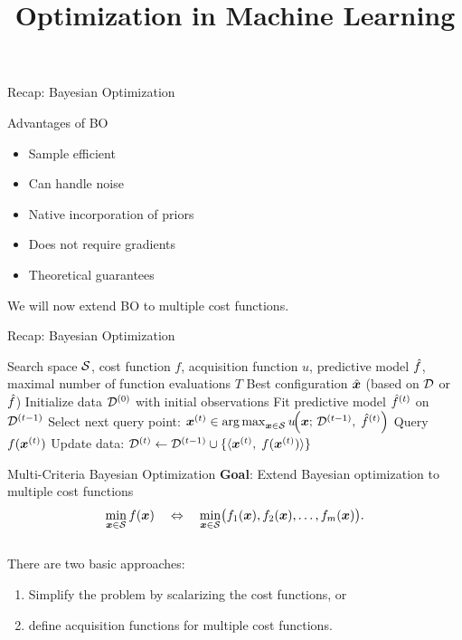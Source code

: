 \documentclass[11pt,compress,t,notes=noshow,xcolor=table]{beamer}
\title{Optimization in Machine Learning}
\begin{document}

\begin{framev}{Recap: Bayesian Optimization}
\begin{block}{Advantages of BO}
\begin{itemize}
\item Sample efficient
\item Can handle noise
\item Native incorporation of priors
\item Does not require gradients
\item Theoretical guarantees
\end{itemize}
\end{block}
We will now extend BO to multiple cost functions.
\end{framev}


\begin{framev}{Recap: Bayesian Optimization}
\begin{center}
\begin{algorithm}[H]
\caption{Bayesian optimization loop}
\begin{algorithmic}[1]
\Require Search space $\S$, cost function $f$, acquisition function $u$, predictive model $\fh$, maximal number of function evaluations $T$
\Ensure Best configuration $\hat{\xv}$ (based on $\D$ or $\fh$)
\State Initialize data $\D^{(0)}$ with initial observations
\State Fit predictive model $\fh^{(t)}$ on $\D^{(t-1)}$
\State Select next query point:
\State $\xv^{(t)} \in \argmax_{\xv \in \S} u\!\Bigl(\xv;\,\D^{(t-1)},\;\fh^{(t)}\Bigr)$
\State Query $f(\xv^{(t)})$
\State Update data:
\State $\D^{(t)} \leftarrow \D^{(t-1)} \cup \{\langle \xv^{(t)},\;f(\xv^{(t)}) \rangle \}$
\EndFor
\end{algorithmic}
\end{algorithm}
\end{center}
\end{framev}


\begin{framev}{Multi-Criteria Bayesian Optimization}
\textbf{Goal}: Extend Bayesian optimization to multiple cost functions
$$
\min_{\xv \in \S}  \fx
\quad \Leftrightarrow \quad
\min_{\xv \in \S} \bigl(\fkx[1], \fkx[2], \dots, \fkx[m]\bigr).
$$\\
\spacer
There are two basic approaches:
\begin{enumerate}
\item Simplify the problem by scalarizing the cost functions, or
\item define acquisition functions for multiple cost functions.
\end{enumerate}
\end{framev}
\end{document}
